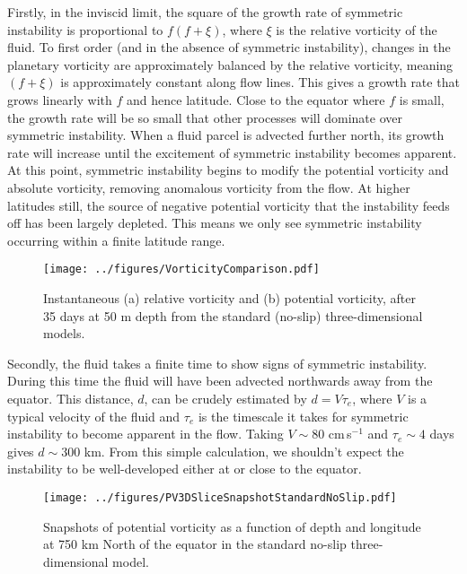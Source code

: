 Firstly, in the inviscid limit, the square of the growth rate of symmetric instability is proportional to $f(f + \xi)$, where $\xi$ is the relative vorticity of the fluid. To first order (and in the absence of symmetric instability), changes in the planetary vorticity are approximately balanced by the relative vorticity, meaning $(f + \xi)$ is approximately constant along flow lines. This gives a growth rate that grows linearly with $f$ and hence latitude. Close to the equator where $f$ is small, the growth rate will be so small that other processes will dominate over symmetric instability. When a fluid parcel is advected further north, its growth rate will increase until the excitement of symmetric instability becomes apparent. At this point, symmetric instability begins to modify the potential vorticity and absolute vorticity, removing anomalous vorticity from the flow. At higher latitudes still, the source of negative potential vorticity that the instability feeds off has been largely depleted. This means we only see symmetric instability occurring within a finite latitude range.

\begin{figure}
    \centering
    \texttt{[image: ../figures/VorticityComparison.pdf]}
    \caption{Instantaneous (a) relative vorticity and (b) potential vorticity, after 35 days at 50 m depth from the standard (no-slip) three-dimensional models.}
    \label{fig:EddyRelativeAndAbsoluteVorticity}
\end{figure}

Secondly, the fluid takes a finite time to show signs of symmetric instability. During this time the fluid will have been advected northwards away from the equator. This distance, $d$, can be crudely estimated by $d = V \tau_e$, where $V$ is a typical velocity of the fluid and $\tau_e$ is the timescale it takes for symmetric instability to become apparent in the flow. Taking $V\sim 80$ cm\,s$^{-1}$ and $\tau_e \sim 4$ days gives $d \sim 300$ km. From this simple calculation, we shouldn't expect the instability to be well-developed either at or close to the equator.


\begin{figure} 
    \centering
    \texttt{[image: ../figures/PV3DSliceSnapshotStandardNoSlip.pdf]}
    \caption{Snapshots of potential vorticity as a function of depth and longitude at 750 km  North of the equator in the standard no-slip three-dimensional model.}
    \label{fig:PVatFixedLatStandardNoSlip3D}
\end{figure}

